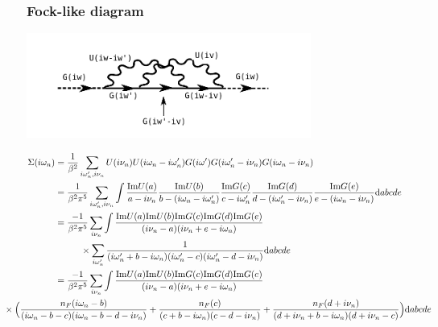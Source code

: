 \documentclass[12pt,a4paper]{scrartcl}
\numberwithin{equation}{section}
\begin{document}
\subsubsection{Fock-like diagram}

\begin{center}
\includegraphics[width=0.7\textwidth]{figs/ipt/diag2_2.png}
\end{center}
\begin{align}
 \Sigma(i\omega_n)
 &= \frac{1}{\beta^2}\sum_{i\omega_n',i\nu_n} U(i\nu_n)U(i\omega_n-i\omega_n') G(i\omega')G(i\omega_n'-i\nu_n)G(i\omega_n-i\nu_n) \\
 &= \frac{1}{\beta^2\pi^5}\sum_{i\omega_n',i\nu_n} 
       \int \frac{\mathrm{Im}U(a)}{a-i\nu_n}
            \frac{\mathrm{Im}U(b)}{b-(i\omega_n-i\omega_n')}
            \frac{\mathrm{Im}G(c)}{c-i\omega_n'}
            \frac{\mathrm{Im}G(d)}{d-(i\omega_n'-i\nu_n)}
            \frac{\mathrm{Im}G(e)}{e-(i\omega_n-i\nu_n)} \mathrm{d}abcde\\
%
 &= \frac{-1}{\beta^2\pi^5}\sum_{i\nu_n} 
       \int \frac{ \mathrm{Im}U(a)\mathrm{Im}U(b)\mathrm{Im}G(c)\mathrm{Im}G(d)\mathrm{Im}G(e) }
                 { (i\nu_n-a)(i\nu_n+e-i\omega_n) } \nonumber \\
&\hspace*{1cm}  \times\sum_{i\omega_n'}  \frac{1}{ (i\omega_n'+b-i\omega_n)(i\omega_n'-c)(i\omega_n'-d-i\nu_n) } \mathrm{d}abcde\\
%
 &= \frac{-1}{\beta^2\pi^5}\sum_{i\nu_n} 
       \int \frac{ \mathrm{Im}U(a)\mathrm{Im}U(b)\mathrm{Im}G(c)\mathrm{Im}G(d)\mathrm{Im}G(e) }
                 { (i\nu_n-a)(i\nu_n+e-i\omega_n) } \nonumber \\
&\hspace*{-2cm}  \times\Big( 
                    \frac{n_F(i\omega_n-b)}{(i\omega_n-b-c)(i\omega_n-b-d-i\nu_n)}
                   +\frac{n_F(c)}{(c+b-i\omega_n)(c-d-i\nu_n)} 
                   +\frac{n_F(d+i\nu_n)}{(d+i\nu_n+b-i\omega_n)(d+i\nu_n-c)}
                 \Big)\mathrm{d}abcde
%
\end{align}
\end{document}
